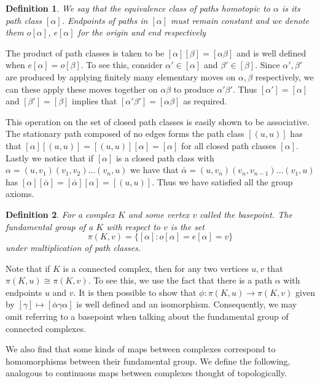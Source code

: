 \documentclass[12pt]{article}
\newtheorem{definition}{Definition}
\theoremstyle{definition}
\numberwithin{equation}{theorem}
\begin{document}
\begin{definition}
  We say that the equivalence class of paths homotopic to $\alpha$ is its \emph{path class} $[\alpha]$. Endpoints of paths in $[\alpha]$ must remain constant and we denote them $o[\alpha]$, $e[\alpha]$ for the origin and end respectively
\end{definition}

The product of path classes is taken to be $[\alpha][\beta] = [\alpha\beta]$ and is well defined when $e[\alpha] = o[\beta]$. To see this, consider $\alpha' \in [\alpha]$ and $\beta' \in [\beta]$. Since $\alpha', \beta'$ are produced by applying finitely many elementary moves on $\alpha,\beta$ respectively, we can these apply these moves together on $\alpha\beta$ to produce $\alpha'\beta'$. Thus $[\alpha'] = [\alpha]$ and $[\beta'] = [\beta]$ implies that $[\alpha'\beta'] = [\alpha\beta]$ as required.

This operation on the set of closed path classes is easily shown to be associative. The stationary path composed of no edges forms the path class $[(u,u)]$ has that $[\alpha][(u,u)] = [(u,u)][\alpha] = [\alpha]$ for all closed path classes $[\alpha]$. Lastly we notice that if $[\alpha]$ is a closed path class with $\alpha=(u,v_1)(v_1,v_2) \dots (v_n,u)$ we have that $\bar{\alpha}=(u,v_n)(v_n,v_{n-1}) \dots (v_1,u)$ has $[\alpha][\bar{\alpha}] = [\bar{\alpha}][\alpha] = [(u,u)]$. Thus we have satisfied all the group axioms.

\begin{definition}
  For a complex $K$ and some vertex $v$ called the \emph{basepoint}. The \emph{fundamental group} of a $K$ with respect to $v$ is the set
  \[
    \pi(K,v) = \{[\alpha]: o[\alpha] = e[\alpha] = v \}
  \]
  under multiplication of path classes.
\end{definition}

Note that if $K$ is a connected complex, then for any two vertices $u,v$ that $\pi(K,u) \cong \pi(K,v)$. To see this, we use the fact that there is a path $\alpha$ with endpoints $u$ and $v$. It is then possible to show that $\phi : \pi(K,u) \rightarrow \pi(K,v)$ given by $[\gamma] \mapsto [\bar{\alpha} \gamma \alpha]$ is well defined and an isomorphism. %
Consequently, we may omit referring to a basepoint when talking about the fundamental group of connected complexes.

We also find that some kinds of maps between complexes correspond to homomorphisms between their fundamental group. We define the following, analogous to continuous maps between complexes thought of topologically.
\end{document}
